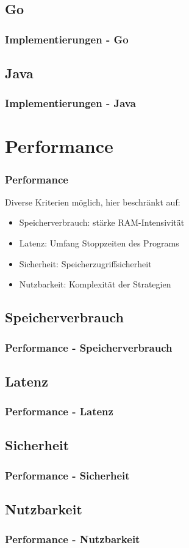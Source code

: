 \documentclass{beamer}
\begin{document}
        \subsection{Go}
            \begin{frame}
                \frametitle{Implementierungen - Go}
            \end{frame}

        \subsection{Java}
            \begin{frame}
                \frametitle{Implementierungen - Java}
            \end{frame}

    \section{Performance}
        \begin{frame}
            \frametitle{Performance}

            Diverse Kriterien möglich, hier beschränkt auf:

            \begin{itemize}
                \item Speicherverbrauch: stärke RAM-Intensivität
                \item Latenz: Umfang Stoppzeiten des Programs
                \item Sicherheit: Speicherzugriffsicherheit
                \item Nutzbarkeit: Komplexität der Strategien
            \end{itemize}
        \end{frame}

        \subsection{Speicherverbrauch}
            \begin{frame}
                \frametitle{Performance - Speicherverbrauch}
            \end{frame}

        \subsection{Latenz}
            \begin{frame}
                \frametitle{Performance - Latenz}
            \end{frame}

        \subsection{Sicherheit}
            \begin{frame}
                \frametitle{Performance - Sicherheit}
            \end{frame}

        \subsection{Nutzbarkeit}
            \begin{frame}
                \frametitle{Performance - Nutzbarkeit}
            \end{frame}
\end{document}
